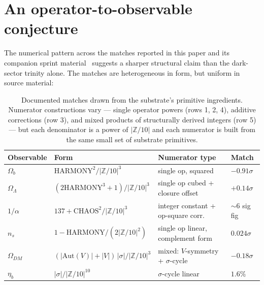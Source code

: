\documentclass[11pt,reqno]{amsart}
\theoremstyle{plain}
\theoremstyle{definition}
\theoremstyle{remark}
\newcommand{\Z}{\mathbb{Z}}
\newcommand{\Aut}{\mathrm{Aut}}
\begin{document}
\section{An operator-to-observable conjecture}\label{sec:meta-conjecture}

The numerical pattern across the matches reported in this paper
and its companion sprint
material~\cite{SandersClaudeChat2026BridgeSprint} suggests a
sharper structural claim than the dark-sector trinity alone.
The matches are heterogeneous in form, but uniform in source
material:

\begin{table}[h]
\centering
\caption{Documented matches drawn from the substrate's primitive
ingredients. Numerator constructions vary --- single operator
powers (rows 1, 2, 4), additive corrections (row 3), and mixed
products of structurally derived integers (row 5) --- but each
denominator is a power of $|\Z/10|$ and each numerator is built
from the same small set of substrate primitives.}
\label{tab:operator-observable}
\begin{tabular}{llll}
\toprule
Observable        & Form                                                  & Numerator type                       & Match \\
\midrule
$\Omega_b$        & $\mathrm{HARMONY}^{2}/|\Z/10|^{3}$                    & single op, squared                   & $-0.91\sigma$ \\
$\Omega_\Lambda$  & $(2\mathrm{HARMONY}^{3} + 1)/|\Z/10|^{3}$             & single op cubed + closure offset     & $+0.14\sigma$ \\
$1/\alpha$        & $137 + \mathrm{CHAOS}^{2}/|\Z/10|^{3}$                & integer constant + op-square corr.   & $\sim 6$ sig fig \\
$n_s$             & $1 - \mathrm{HARMONY}/(2|\Z/10|^{2})$                 & single op linear, complement form    & $0.024\sigma$ \\
$\Omega_{DM}$     & $(|\Aut(V)| + |V|)\,|\sigma|/|\Z/10|^{3}$             & mixed: $V$-symmetry + $\sigma$-cycle & $-0.18\sigma$ \\
$\eta_b$          & $|\sigma|/|\Z/10|^{10}$                                & $\sigma$-cycle linear                & $1.6\%$ \\
\bottomrule
\end{tabular}
\end{table}
\end{document}
